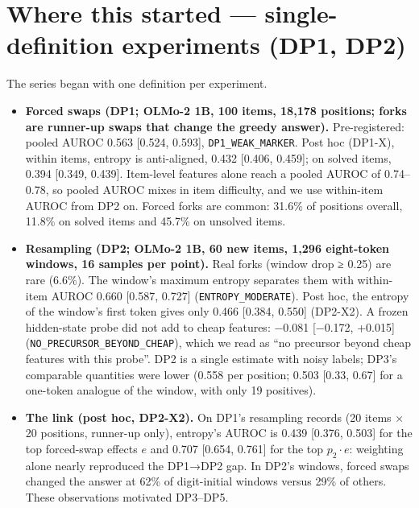\documentclass[
  10pt,
  a4paper,
]{article}
\providecommand{\tightlist}{%
  \setlength{\itemsep}{0pt}\setlength{\parskip}{0pt}}
\begin{document}
\hypertarget{where-this-started-single-definition-experiments-dp1-dp2}{%
\section{Where this started --- single-definition experiments (DP1, DP2)}\label{where-this-started-single-definition-experiments-dp1-dp2}}

The series began with one definition per experiment.

\begin{itemize}
\tightlist
\item
  \textbf{Forced swaps (DP1; OLMo-2 1B, 100 items, 18,178 positions; forks are runner-up swaps that change the greedy answer).} Pre-registered: pooled AUROC 0.563 {[}0.524, 0.593{]},
  \texttt{DP1\_\allowbreak{}WEAK\_\allowbreak{}MARKER}. Post hoc (DP1-X), within items, entropy is anti-aligned, 0.432 {[}0.406, 0.459{]}; on solved items, 0.394 {[}0.349, 0.439{]}. Item-level features alone reach a pooled
  AUROC of 0.74--0.78, so pooled AUROC mixes in item difficulty, and we use within-item AUROC from DP2 on. Forced forks are common: 31.6\% of positions overall, 11.8\% on solved items and 45.7\% on
  unsolved items.
\item
  \textbf{Resampling (DP2; OLMo-2 1B, 60 new items, 1,296 eight-token windows, 16 samples per point).} Real forks (window drop ≥ 0.25) are rare (6.6\%). The window's maximum entropy separates them
  with within-item AUROC 0.660 {[}0.587, 0.727{]} (\texttt{ENTROPY\_\allowbreak{}MODERATE}). Post hoc, the entropy of the window's first token gives only 0.466 {[}0.384, 0.550{]} (DP2-X2). A frozen hidden-state
  probe did not add to cheap features: −0.081 {[}−0.172, +0.015{]} (\texttt{NO\_\allowbreak{}PRECURSOR\_\allowbreak{}BEYOND\_\allowbreak{}CHEAP}), which we read as ``no precursor beyond cheap features with this probe''. DP2 is a single
  estimate with noisy labels; DP3's comparable quantities were lower (0.558 per position; 0.503 {[}0.33, 0.67{]} for a one-token analogue of the window, with only 19 positives).
\item
  \textbf{The link (post hoc, DP2-X2).} On DP1's resampling records (20 items × 20 positions, runner-up only), entropy's AUROC is 0.439 {[}0.376, 0.503{]} for the top forced-swap effects \(e\) and
  0.707 {[}0.654, 0.761{]} for the top \(p_2 \cdot e\): weighting alone nearly reproduced the DP1→DP2 gap. In DP2's windows, forced swaps changed the answer at 62\% of digit-initial windows versus
  29\% of others. These observations motivated DP3--DP5.
\end{itemize}
\end{document}
